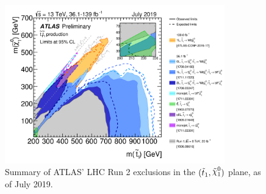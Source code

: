 \begin{figure}[!htb]
    \begin{center}
        \includegraphics[width=0.85\textwidth]{figures/conclusion/ATLAS_SUSY_Stop_tLSP}
        \caption{
            Summary of ATLAS' LHC Run 2 exclusions in the $(\stopone, \ninoone)$ plane,
            as of July 2019.
        }
        \label{fig:run2_stop_summary}
    \end{center}
\end{figure}
